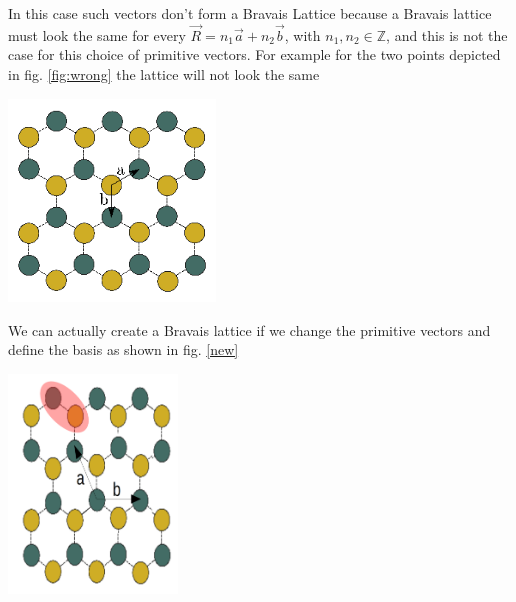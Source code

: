 \begin{questions}
\begin{solution}
  In this case such vectors don't form a Bravais Lattice because a Bravais lattice must look the same for every $\vec{R} = n_1\vec{a} + n_2 \vec{b}$, with $n_1,n_2\in \mathbb{Z}$, and this is not the case for this choice of primitive vectors.
  For example for the two points depicted in fig. \ref{fig:wrong} the lattice will not look the same
\begin{center}
  \includegraphics[width=55mm]{original}
\end{center}
\label{fig:wrong}

\end{solution}

\begin{solution}

We can actually create a Bravais lattice if we change the primitive vectors and define the basis as shown in fig. \ref{new}
\clearpage
\begin{center}
  \includegraphics[width=45mm]{lat}
\end{center}

\label{new}


\end{solution}
\end{questions}
